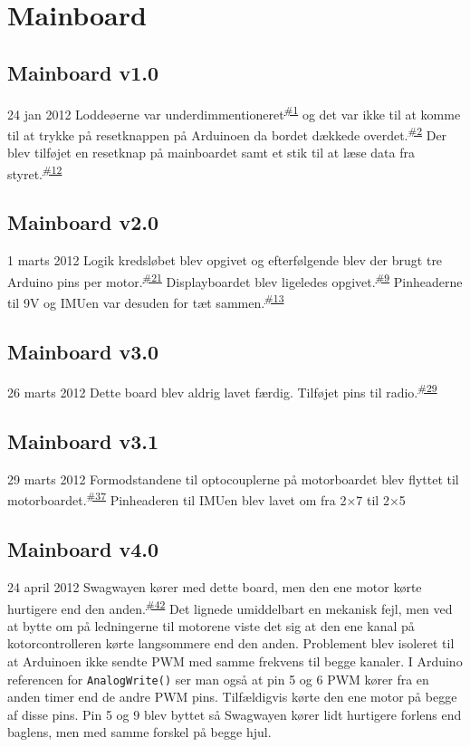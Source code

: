 \documentclass[a4paper,twoside,article,danish,table]{memoir}
\newcommand{\boarddate}[1]{\textcolor{blue!80!black}{#1}}
\newcommand{\issue}[1]{\textsuperscript{\textcolor{blue!80!black}{\href{https://github.com/neic/Swagway/issues/#1}{\##1}}}}
\begin{document}
\section{Mainboard}

\subsection{Mainboard v1.0}
\boarddate{24 jan 2012}
Loddeøerne var underdimmentioneret\issue{1} og det var ikke til at komme til at trykke på resetknappen på Arduinoen da bordet dækkede overdet.\issue{2} Der blev tilføjet en resetknap på mainboardet samt et stik til at læse data fra styret.\issue{12}

\subsection{Mainboard v2.0}
\boarddate{1 marts 2012}
Logik kredsløbet blev opgivet og efterfølgende blev der brugt tre Arduino pins per motor.\issue{21} Displayboardet blev ligeledes opgivet.\issue{9} Pinheaderne til 9V og IMUen var desuden for tæt sammen.\issue{13}

\subsection{Mainboard v3.0}
\boarddate{26 marts 2012} Dette board blev aldrig lavet færdig.
Tilføjet pins til radio.\issue{29}

\subsection{Mainboard v3.1}
\boarddate{29 marts 2012}
Formodstandene til optocouplerne på motorboardet blev flyttet til motorboardet.\issue{37}
Pinheaderen til IMUen blev lavet om fra 2×7 til 2×5

\subsection{Mainboard v4.0}\label{sec:main40}
\boarddate{24 april 2012}
Swagwayen kører med dette board, men den ene motor kørte hurtigere end den anden.\issue{42} Det lignede umiddelbart en mekanisk fejl, men ved at bytte om på ledningerne til motorene viste det sig at den ene kanal på kotorcontrolleren kørte langsommere end den anden. Problement blev isoleret til at Arduinoen ikke sendte PWM med samme frekvens til begge kanaler. I Arduino referencen for \texttt{AnalogWrite()} ser man også at pin 5 og 6 PWM kører fra en anden timer end de andre PWM pins. Tilfældigvis kørte den ene motor på begge af disse pins. Pin 5 og 9 blev byttet så Swagwayen kører lidt hurtigere forlens end baglens, men med samme forskel på begge hjul.
\end{document}
